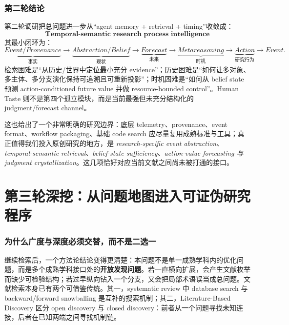 \documentclass[11pt,a4paper]{ctexart}
\begin{document}
\section{第二轮结论}

第二轮调研把总问题进一步从“agent memory + retrieval + timing”收敛成：
\begin{equation}
\boxed{
\textbf{Temporal-semantic research process intelligence}
}
\end{equation}
其最小闭环为：
\begin{equation}
\boxed{
\underbrace{Event/Provenance}_{\text{事实}}
\to
\underbrace{Abstraction/Belief}_{\text{现状}}
\to
\underbrace{Forecast}_{\text{未来}}
\to
\underbrace{Metareasoning}_{\text{时机}}
\to
\underbrace{Action}_{\text{研究行为}}
\to Event.
}
\end{equation}
检索困难是“从历史/世界中定位最小充分 evidence”；历史困难是“如何让多对象、多主体、多分支演化保持可追溯且可重新投影”；时机困难是“如何从 belief state 预测 action-conditioned future value 并做 resource-bounded control”。Human Taste 则不是第四个孤立模块，而是当前最强但未充分结构化的 judgment/forecast channel。

这也给出了一个非常明确的研究边界：底层 telemetry、provenance、event format、workflow packaging、基础 code search 应尽量复用成熟标准与工具；真正值得我们投入原创研究的地方，是 \emph{research-specific event abstraction、temporal-semantic retrieval、belief-state sufficiency、action-value forecasting 与 judgment crystallization}。这几项恰好对应当前文献之间尚未被打通的接口。



\part{第三轮深挖：从问题地图进入可证伪研究程序}

\section{为什么广度与深度必须交替，而不是二选一}

继续检索后，一个方法论结论变得更清楚：本问题不是单一成熟学科内的优化问题，而是多个成熟学科接口处的\textbf{开放发现问题}。若一直横向扩展，会产生文献枚举而缺少可检验结构；若过早纵向钻入一个分支，又会把局部术语误当成总问题。文献检索本身已有两个可借鉴传统。其一，systematic review 中 database search 与 backward/forward snowballing 是互补的搜索机制\parencite{wohlin2014snowballing,wohlin2015experiences}；其二，Literature-Based Discovery 区分 open discovery 与 closed discovery：前者从一个问题寻找未知连接，后者在已知两端之间寻找机制链\parencite{henry2017lbd,gopalakrishnan2019lbd}。
\end{document}
